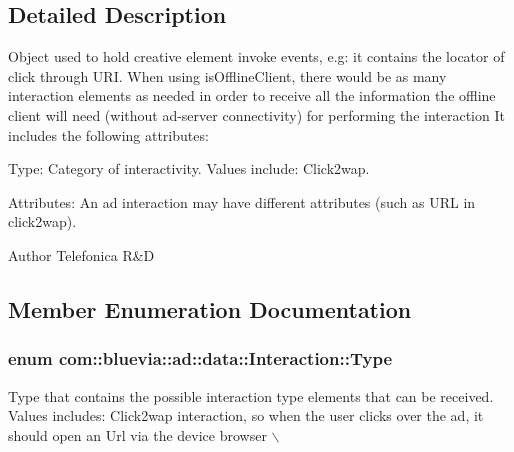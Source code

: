 \subsection{Detailed Description}
Object used to hold creative element invoke events, e.g: it contains the locator of click through URI. When using isOfflineClient, there would be as many interaction elements as needed in order to receive all the information the offline client will need (without ad-\/server connectivity) for performing the interaction It includes the following attributes: 
\begin{DoxyItemize}
\item Type: Category of interactivity. Values include: Click2wap. 
\item Attributes: An ad interaction may have different attributes (such as URL in click2wap). 
\end{DoxyItemize}

\begin{DoxyAuthor}{Author}
Telefonica R\&D 
\end{DoxyAuthor}


\subsection{Member Enumeration Documentation}
\hypertarget{classcom_1_1bluevia_1_1ad_1_1data_1_1Interaction_ae54ba32a2f1d9d40a450ace53828a2ee}{
\subsubsection[{Type}]{\setlength{\rightskip}{0pt plus 5cm}enum {\bf com::bluevia::ad::data::Interaction::Type}}}
\label{classcom_1_1bluevia_1_1ad_1_1data_1_1Interaction_ae54ba32a2f1d9d40a450ace53828a2ee}
Type that contains the possible interaction type elements that can be received. Values includes: Click2wap interaction, so when the user clicks over the ad, it should open an Url via the device browser $\backslash$ 


